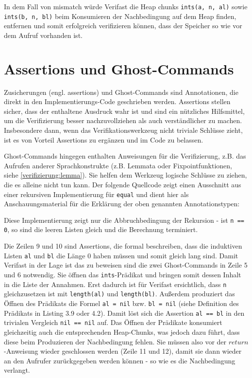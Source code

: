 In dem Fall von mismatch würde Verifast die Heap chunks \lstinline{ints(a, n, al)} sowie
\lstinline{ints(b, n, bl)} beim Konsumieren der Nachbedingung auf dem Heap finden, entfernen und
somit erfolgreich verifizieren können, dass der Speicher so wie vor dem Aufruf vorhanden ist.



\section{Assertions und Ghost-Commands}

Zusicherungen (engl. assertions) und Ghost-Commands sind Annotationen, die direkt in den Implementierungs-Code
geschrieben werden. Assertions stellen sicher, dass der enthaltene Ausdruck wahr ist und sind ein nützliches Hilfsmittel, 
um die Verifizierung besser nachzuvollziehen als auch verständlicher zu machen. Insbesondere dann, wenn das Verifikationswerkzeug 
nicht triviale Schlüsse zieht, ist es von Vorteil Assertions zu ergänzen und im Code zu belassen.

Ghost-Commands hingegen enthalten Anweisungen für die Verifizierung, z.B. das Aufrufen anderer Sprachkonstrukte 
(z.B. Lemmata oder Fixpointfunktionen, siehe \ref{verifizierung:lemma}). Sie helfen dem Werkzeug logische Schlüsse 
zu ziehen, die es alleine nicht tun kann.
\newline
\newline
Der folgende Quellcode zeigt einen Ausschnitt aus einer rekursiven Implementierung für \lstinline{equal} und dient
hier als Anschauungsmaterial für die Erklärung der oben genannten Annotationstypen:



Diese Implementierung zeigt nur die Abbruchbedingung der Rekursion - ist \lstinline{n == 0}, so sind die
leeren Listen gleich und die Berechnung terminiert. 

Die Zeilen 9 und 10 sind Assertions, die formal beschreiben, dass die induktiven Listen \lstinline{al} und
\lstinline{bl} die Länge 0 haben müssen und somit gleich lang sind. Damit Verifast in der Lage ist das zu
beweisen sind die zwei Ghost-Commands in Zeile 5 und 6 notwendig. Sie öffnen das \lstinline{ints}-Prädikat
und bringen somit dessen Inhalt in die Liste der Annahmen. Erst dadurch ist für Verifast ersichtlich, dass 
\lstinline{n} gleichzusetzen ist mit \texttt{length(al)} und \texttt{length(bl)}. Außerdem produziert
das Öffnen des Prädikats die Formel \lstinline{al = nil} bzw. \lstinline{bl = nil} (siehe Definition
des Prädikats in Listing 3.9 oder 4.2). Damit löst sich die Assertion \lstinline{al == bl} in den
trivialen Vergleich \lstinline{nil == nil} auf.
\newline
\newline
Das Öffnen der Prädikate konsumiert gleichzeitig auch die entsprechenden Heap-Chunks, was jedoch dazu führt,
dass diese beim Produzieren der Nachbedingung fehlen. Sie müssen also vor der \(return\)-Anweisung
wieder geschlossen werden (Zeile 11 und 12), damit sie dann wieder an den Aufrufer zurückgegeben werden können 
- so wie es die Nachbedingung verlangt.

